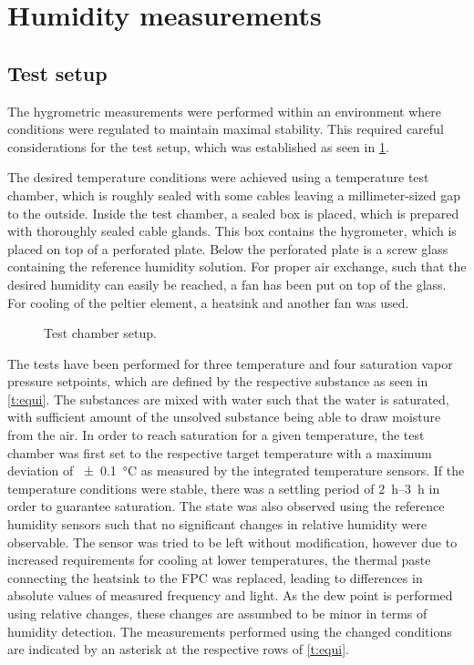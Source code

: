 \section{Humidity measurements}

\subsection{Test setup}
The hygrometric measurements were performed within an environment where conditions were regulated to maintain maximal stability. This required careful considerations for the test setup, which was established as seen in \cref{d:test_chamber}. 

The desired temperature conditions were achieved using a temperature test chamber, which is roughly sealed with some cables leaving a millimeter-sized gap to the outside. Inside the test chamber, a sealed box is placed, which is prepared with thoroughly sealed cable glands. This box contains the hygrometer, which is placed on top of a perforated plate. Below the perforated plate is a screw glass containing the reference humidity solution. For proper air exchange, such that the desired humidity can easily be reached, a fan has been put on top of the glass. For cooling of the peltier element, a heatsink and another fan was used.

\begin{figure}[h]
    \centering
    
    \caption{Test chamber setup.}
    \label{d:test_chamber}
\end{figure}

The tests have been performed for three temperature and four saturation vapor pressure setpoints, which are defined by the respective substance as seen in \cref{t:equi}. The substances are mixed with water such that the water is saturated, with sufficient amount of the unsolved substance being able to draw moisture from the air. In order to reach saturation for a given temperature, the test chamber was first set to the respective target temperature with a maximum deviation of \qty{\pm0.1}{\celsius} as measured by the integrated temperature sensors. If the temperature conditions were stable, there was a settling period of \qtyrange{2}{3}{h} in order to guarantee saturation. The state was also observed using the reference humidity sensors such that no significant changes in relative humidity were observable. The sensor was tried to be left without modification, however due to increased requirements for cooling at lower temperatures, the thermal paste connecting the heatsink to the \gls{FPC} was replaced, leading to differences in absolute values of measured frequency and light. As the dew point is performed using relative changes, these changes are assumbed to be minor in terms of humidity detection. The measurements performed using the changed conditions are indicated by an asterisk at the respective rows of \cref{t:equi}.

